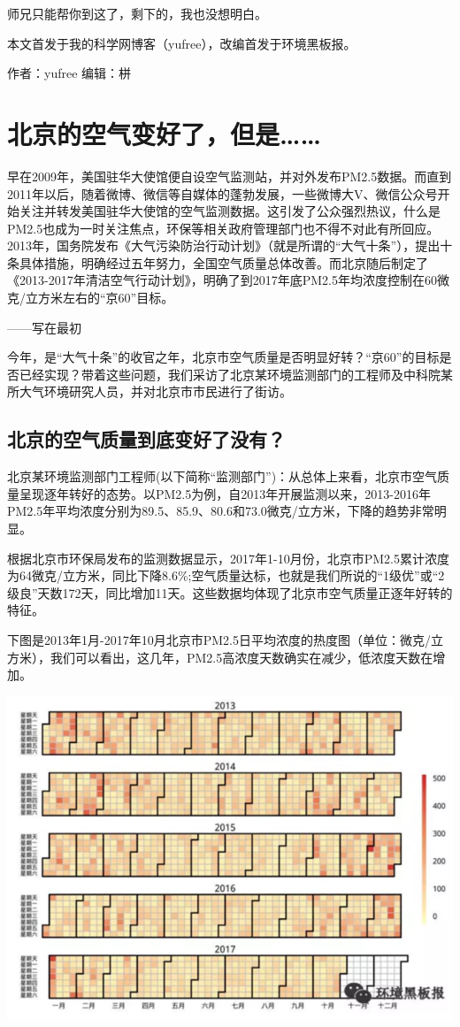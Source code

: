 \documentclass[]{book}
\begin{document}
师兄只能帮你到这了，剩下的，我也没想明白。

本文首发于我的科学网博客（yufree），改编首发于环境黑板报。

作者：yufree 编辑：栟

\section{北京的空气变好了，但是\ldots{}\ldots{}}

早在2009年，美国驻华大使馆便自设空气监测站，并对外发布PM2.5数据。而直到2011年以后，随着微博、微信等自媒体的蓬勃发展，一些微博大V、微信公众号开始关注并转发美国驻华大使馆的空气监测数据。这引发了公众强烈热议，什么是PM2.5也成为一时关注焦点，环保等相关政府管理部门也不得不对此有所回应。2013年，国务院发布《大气污染防治行动计划》（就是所谓的``大气十条''），提出十条具体措施，明确经过五年努力，全国空气质量总体改善。而北京随后制定了《2013-2017年清洁空气行动计划》，明确了到2017年底PM2.5年均浓度控制在60微克/立方米左右的``京60''目标。

------写在最初

今年，是``大气十条''的收官之年，北京市空气质量是否明显好转？``京60''的目标是否已经实现？带着这些问题，我们采访了北京某环境监测部门的工程师及中科院某所大气环境研究人员，并对北京市市民进行了街访。

\subsection{北京的空气质量到底变好了没有？}

北京某环境监测部门工程师(以下简称``监测部门'')：从总体上来看，北京市空气质量呈现逐年转好的态势。以PM2.5为例，自2013年开展监测以来，2013-2016年PM2.5年平均浓度分别为89.5、85.9、80.6和73.0微克/立方米，下降的趋势非常明显。

根据北京市环保局发布的监测数据显示，2017年1-10月份，北京市PM2.5累计浓度为64微克/立方米，同比下降8.6\%;空气质量达标，也就是我们所说的``1级优''或``2级良''天数172天，同比增加11天。这些数据均体现了北京市空气质量正逐年好转的特征。

下图是2013年1月-2017年10月北京市PM2.5日平均浓度的热度图（单位：微克/立方米），我们可以看出，这几年，PM2.5高浓度天数确实在减少，低浓度天数在增加。

\includegraphics[width=8.33in]{images/air1}
\end{document}
